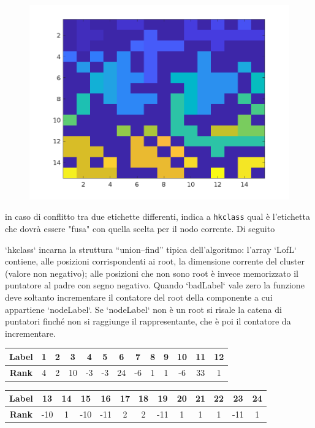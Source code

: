\begin{figure}[H]
\begin{minipage}{0.45\textwidth}
	\end{minipage}
	\hfill
	\begin{minipage}{0.5\textwidth}
		\centering
		\includegraphics[width=\linewidth]{images/labels}
		\label{fig:basegrid}
	\end{minipage}
\end{figure}
in caso di conflitto tra due etichette differenti, indica a \texttt{hkclass} qual è l’etichetta che dovrà essere "fusa" con quella scelta per il nodo corrente.
Di seguito 

`hkclass` incarna la struttura “union–find” tipica dell’algoritmo: l’array `LofL` contiene, alle posizioni corrispondenti ai root, la dimensione corrente del cluster (valore non negativo); alle posizioni che non sono root è invece memorizzato il puntatore al padre con segno negativo. Quando `badLabel` vale zero la funzione deve soltanto incrementare il contatore del root della componente a cui appartiene `nodeLabel`. Se `nodeLabel` non è un root si risale la catena di puntatori finché non si raggiunge il rappresentante, che è poi il contatore da incrementare.

\begin{tabular}{|c|*{12}{c|}}
	\hline
	\textbf{Label} & 1 & 2 & 3 & 4 & 5 & 6 & 7 & 8 & 9 & 10 & 11 & 12 \\
	\hline
	\textbf{Rank} & 4 & 2 & 10 & -3 & -3 & 24 & -6 & 1 & 1 & -6 & 33 & 1 \\
	\hline
\end{tabular}

\vspace{0.5cm}

\begin{tabular}{|c|*{12}{c|}}
	\hline
	\textbf{Label} & 13 & 14 & 15 & 16 & 17 & 18 & 19 & 20 & 21 & 22 & 23 & 24 \\
	\hline
	\textbf{Rank} & -10 & 1 & -10 & -11 & 2 & 2 & -11 & 1 & 1 & 1 & -11 & 1 \\
	\hline
\end{tabular}

